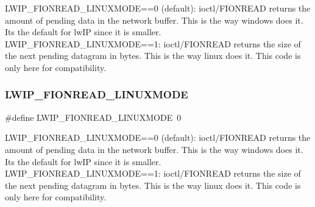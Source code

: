 L\+W\+I\+P\+\_\+\+F\+I\+O\+N\+R\+E\+A\+D\+\_\+\+L\+I\+N\+U\+X\+M\+O\+DE==0 (default)\+: ioctl/\+F\+I\+O\+N\+R\+E\+AD returns the amount of pending data in the network buffer. This is the way windows does it. It\textquotesingle{}s the default for lw\+IP since it is smaller. L\+W\+I\+P\+\_\+\+F\+I\+O\+N\+R\+E\+A\+D\+\_\+\+L\+I\+N\+U\+X\+M\+O\+DE==1\+: ioctl/\+F\+I\+O\+N\+R\+E\+AD returns the size of the next pending datagram in bytes. This is the way linux does it. This code is only here for compatibility. \mbox{\label{group__lwip__opts__socket_ga0543eea2abe390d0bdc843c33debd762}} 
\subsubsection{\texorpdfstring{L\+W\+I\+P\+\_\+\+F\+I\+O\+N\+R\+E\+A\+D\+\_\+\+L\+I\+N\+U\+X\+M\+O\+DE}{LWIP\_FIONREAD\_LINUXMODE}\hspace{0.1cm}{\footnotesize\ttfamily [2/2]}}
{\footnotesize\ttfamily \#define L\+W\+I\+P\+\_\+\+F\+I\+O\+N\+R\+E\+A\+D\+\_\+\+L\+I\+N\+U\+X\+M\+O\+DE~0}

L\+W\+I\+P\+\_\+\+F\+I\+O\+N\+R\+E\+A\+D\+\_\+\+L\+I\+N\+U\+X\+M\+O\+DE==0 (default)\+: ioctl/\+F\+I\+O\+N\+R\+E\+AD returns the amount of pending data in the network buffer. This is the way windows does it. It\textquotesingle{}s the default for lw\+IP since it is smaller. L\+W\+I\+P\+\_\+\+F\+I\+O\+N\+R\+E\+A\+D\+\_\+\+L\+I\+N\+U\+X\+M\+O\+DE==1\+: ioctl/\+F\+I\+O\+N\+R\+E\+AD returns the size of the next pending datagram in bytes. This is the way linux does it. This code is only here for compatibility. \mbox{\label{group__lwip__opts__socket_ga484c38ab08f60d5b3335d23d31f9a402}} 

